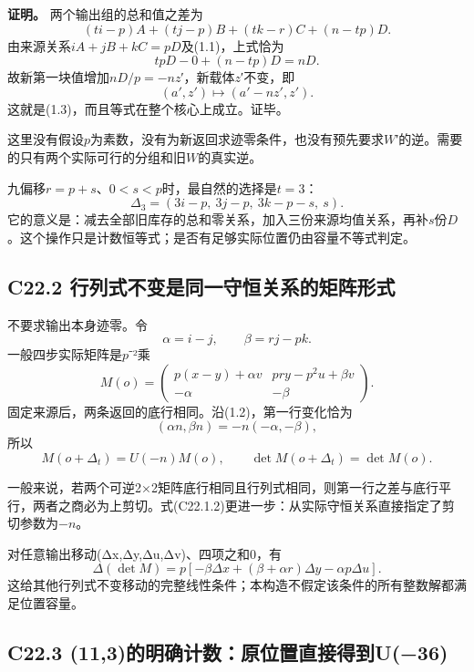 \documentclass[11pt,a4paper]{article}
\theoremstyle{definition}
\numberwithin{equation}{section}
\begin{document}
\textbf{{证明。}} {两个输出组的总和值之差为} \[
(ti-p)A+(tj-p)B+(tk-r)C+(n-tp)D.
\] {由来源关系\ensuremath{iA+jB+kC=pD}及(1.1)，上式恰为} \[
tpD-0+(n-tp)D=nD.
\] {故新第一块值增加\ensuremath{nD/p=-nz}′，新载体\ensuremath{z}′不变，即} \[
(a',z')\longmapsto(a'-nz',z').
\] {这就是(1.3)，而且等式在整个核心上成立。证毕。}

{这里没有假设\ensuremath{p}为素数，没有为新返回求迹零条件，也没有预先要求\ensuremath{W}′的逆。需要的只有两个实际可行的分组和旧\ensuremath{W}的真实逆。}

{九偏移\ensuremath{r=p+s}、\ensuremath{0<s<p}时，最自然的选择是\ensuremath{t=3}：} \[
\boxed{\Delta_3=(3i-p,\ 3j-p,\ 3k-p-s,\ s).}
\tag{C22.1.4}
\] {它的意义是：减去全部旧库存的总和零关系，加入三份来源均值关系，再补\ensuremath{s}份\ensuremath{D}。这个操作只是计数恒等式；是否有足够实际位置仍由容量不等式判定。}

\subsection*{\texorpdfstring{{C22.2} {行列式不变是同一守恒关系的矩阵形式}}{C22.2 行列式不变是同一守恒关系的矩阵形式}}\label{C22-h147}

{不要求输出本身迹零。令} \[
\alpha=i-j,\qquad\beta=rj-pk.
\] {一般四步实际矩阵是\ensuremath{p}⁻²乘} \[
M(o)=
\begin{pmatrix}
p(x-y)+\alpha v & pry-p^2u+\beta v\\
-\alpha&-\beta
\end{pmatrix}.
\tag{C22.2.1}
\] {固定来源后，两条返回的底行相同。沿(1.2)，第一行变化恰为} \[
(\alpha n,\beta n)=-n(-\alpha,-\beta),
\] {所以} \[
M(o+\Delta_t)=U(-n)M(o),\qquad
\det M(o+\Delta_t)=\det M(o).
\tag{C22.2.2}
\]

{一般来说，若两个可逆2×2矩阵底行相同且行列式相同，则第一行之差与底行平行，两者之商必为上剪切。式(C22.1.2)更进一步：从实际守恒关系直接指定了剪切参数为−\ensuremath{n}。}

{对任意输出移动(Δx,Δy,Δu,Δv)、四项之和0，有} \[
\Delta(\det M)
=p[-\beta\Delta x+(\beta+\alpha r)\Delta y-\alpha p\Delta u].
\tag{C22.2.3}
\] {这给其他行列式不变移动的完整线性条件；本构造不假定该条件的所有整数解都满足位置容量。}

\subsection*{\texorpdfstring{{C22.3} {(11,3)的明确计数：原位置直接得到U(−36)}}{C22.3 (11,3)的明确计数：原位置直接得到U(−36)}}\label{C22-h148}
\end{document}
